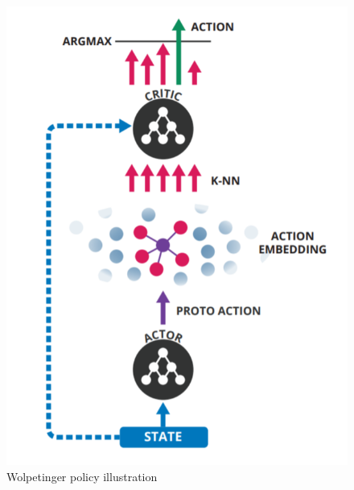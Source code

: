 \begin{figure}[!h]
\centering
\includegraphics[scale=0.35]{fig/wolpetinger-policy.png}
\caption{Wolpetinger policy illustration}
\label{fig:wolpetinger}
\end{figure}

